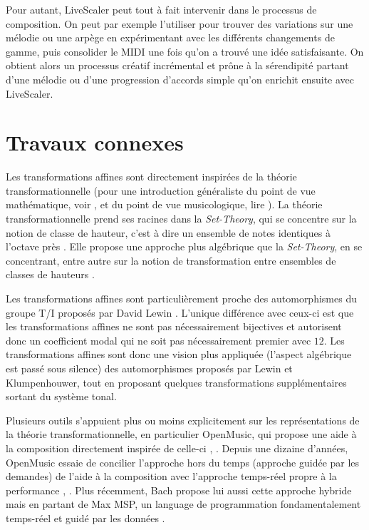 \documentclass{article}
\begin{document}
Pour autant, LiveScaler peut tout à fait intervenir dans le processus de composition. On peut par exemple l'utiliser pour trouver des variations sur une mélodie ou une arpège en expérimentant avec les différents changements de gamme, puis consolider le MIDI une fois qu'on a trouvé une idée satisfaisante. On obtient alors un processus créatif incrémental et prône à la sérendipité partant d'une mélodie ou d'une progression d'accords simple qu'on enrichit ensuite avec LiveScaler.


\section{Travaux connexes}

Les transformations affines sont directement inspirées de la théorie transformationnelle  (pour une introduction généraliste du point de vue mathématique, voir \cite{andreatta2008calcul}, et du point de vue musicologique, lire \cite{andreatta2014introduction}). La théorie transformationnelle prend ses racines dans la \emph{Set-Theory}, qui se concentre sur la notion de classe de hauteur, c'est à dire un ensemble de notes identiques à l'octave près \cite{forte1973structure}. Elle propose une approche plus algébrique que la \emph{Set-Theory}, en se concentrant, entre autre sur la notion de transformation entre ensembles de classes de hauteurs \cite{lewin1987generalized}.

Les transformations affines sont particulièrement proche des automorphismes du groupe T/I proposés par David Lewin \cite{lewin1990klumpenhouwer}. L'unique différence avec ceux-ci est que les transformations affines ne sont pas nécessairement bijectives et autorisent donc un coefficient modal qui ne soit pas nécessairement premier avec $12$. Les transformations affines sont donc  une vision plus appliquée (l'aspect algébrique est passé sous silence) des automorphismes proposés par Lewin et Klumpenhouwer, tout en proposant quelques transformations supplémentaires sortant du système tonal.


Plusieurs outils s'appuient plus ou moins explicitement sur les représentations de la théorie transformationnelle, en particulier OpenMusic, qui propose une aide à la composition directement inspirée de celle-ci \cite{andreatta2003implementing}, \cite{andreatta2003formalisation}. Depuis une dizaine d'années, OpenMusic essaie de concilier l'approche hors du temps (approche guidée par les demandes) de l'aide à la composition avec l'approche temps-réel propre à la performance \cite{bresson2014reactive}, \cite{bresson2017next}. Plus récemment, Bach propose lui aussi cette approche hybride mais en partant de Max MSP, un language de programmation fondamentalement temps-réel et guidé par les données \cite{agostini2021programming}.
\end{document}
